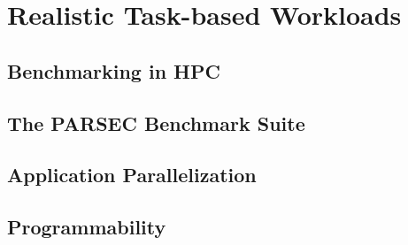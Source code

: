 
\chapter{Realistic Task-based Workloads}
\label{chap:task_based_benchmarks}

\newcommand{\MAXPERF}{42\%}
\newcommand{\AVERAGEPERF}{13\%}
\newcommand{\MAXLOC}{81\%}
\newcommand{\AVERAGELOC}{28\%}



\section{Benchmarking in HPC}
\label{sec:hpc_benchmarking}

\section{The PARSEC Benchmark Suite}
\label{sec:parsec}

\label{sec:parsecss_implementation}
\section{Application Parallelization}

\section{Programmability}


